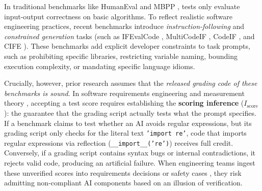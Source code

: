 \documentclass[runningheads]{llncs}
\begin{document}
In traditional benchmarks like HumanEval \cite{human_eval_repository} and MBPP \cite{austin_mbpp_2021}, tests only evaluate input-output correctness on basic algorithms. To reflect realistic software engineering practices, recent benchmarks introduce \emph{instruction-following} and \emph{constrained generation} tasks (such as IFEvalCode \cite{yang_ifevalcode_2025}, MultiCodeIF \cite{sysusel_multicodeif_2026}, CodeIF \cite{yan_codeif_2025}, and CIFE \cite{cife_benchmark_2025}). These benchmarks add explicit developer constraints to task prompts, such as prohibiting specific libraries, restricting variable naming, bounding execution complexity, or mandating specific language idioms.

Crucially, however, prior research assumes that the \emph{released grading code of these benchmarks is sound}. In software requirements engineering and measurement theory \cite{kane_validation}, accepting a test score requires establishing the \textbf{scoring inference} ($I_{\text{score}}$): the guarantee that the grading script actually tests what the prompt specifies. If a benchmark claims to test whether an AI avoids regular expressions, but its grading script only checks for the literal text \texttt{'import re'}, code that imports regular expressions via reflection (\texttt{\_\_import\_\_('re')}) receives full credit. Conversely, if a grading script contains syntax bugs or internal contradictions, it rejects valid code, producing an artificial failure. When engineering teams ingest these unverified scores into requirements decisions or safety cases \cite{hawkins_amlas_2021,lawford_safety_case_impact_2017}, they risk admitting non-compliant AI components based on an illusion of verification.
\end{document}
